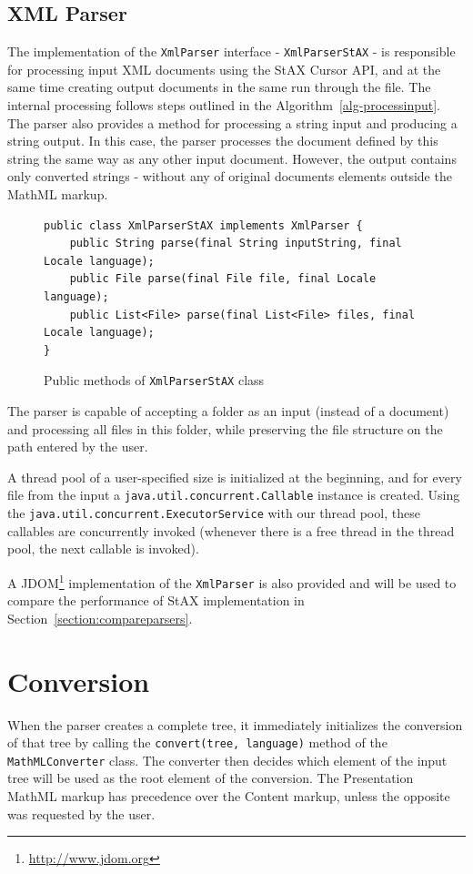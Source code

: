 \documentclass[11pt,oneside,final]{fithesis2}
\begin{document}
\subsection{XML Parser}
The implementation of the \texttt{XmlParser} interface - \texttt{XmlParserStAX} - is responsible for processing input XML documents using the StAX Cursor API, and at the same time creating output documents in the same run through the file. The internal processing follows steps outlined in the Algorithm~\ref{alg-processinput}. The parser also provides a method for processing a string input and producing a string output. In this case, the parser processes the document defined by this string the same way as any other input document. However, the output contains only converted strings - without any of original documents elements outside the MathML markup.
\begin{figure}[!ht]
\begin{lstlisting}
public class XmlParserStAX implements XmlParser {
	public String parse(final String inputString, final Locale language);
	public File parse(final File file, final Locale language);
	public List<File> parse(final List<File> files, final Locale language);
}
\end{lstlisting}
\caption{Public methods of \texttt{XmlParserStAX} class}
\label{fig:xmlparserstax}
\end{figure}

The parser is capable of accepting a folder as an input (instead of a document) and processing all files in this folder, while preserving the file structure on the path entered by the user. 

A thread pool of a user-specified size is initialized at the beginning, and for every file from the input a \texttt{java.util.concurrent.Callable} instance is created. Using the \texttt{java.util.concurrent.ExecutorService} with our thread pool, these callables are concurrently invoked (whenever there is a free thread in the thread pool, the next callable is invoked). 

A JDOM\footnote{\url{http://www.jdom.org}} implementation of the \texttt{XmlParser} is also provided and will be used to compare the performance of StAX implementation in Section~\ref{section:compareparsers}.

\section{Conversion}
When the parser creates a complete tree, it immediately initializes the conversion of that tree by calling the \texttt{convert(tree, language)} method of the \texttt{MathMLConverter} class. The converter then decides which element of the input tree will be used as the root element of the conversion. The Presentation MathML markup has precedence over the Content markup, unless the opposite was requested by the user.
\end{document}
